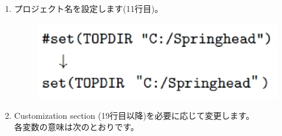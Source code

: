 \begin{narrow}[20pt]
	\begin{enumerate}
	    \item
		プロジェクト名を設定します(11行目)。

\ifLwarp
		\begin{figure}[h]
			\begin{center}
			\includegraphics[width=\textwidth]{fig/command-3-1-b.eps}
				\end{center}
			\label{fig:DownloadTree}
		\end{figure}
\else
		\begin{narrow}[s][5pt]
		\end{narrow}
\fi

	    \item
		Customization section (19行目以降)を必要に応じて変更します。\\
		各変数の意味は次のとおりです。


\end{enumerate}
\end{narrow}
